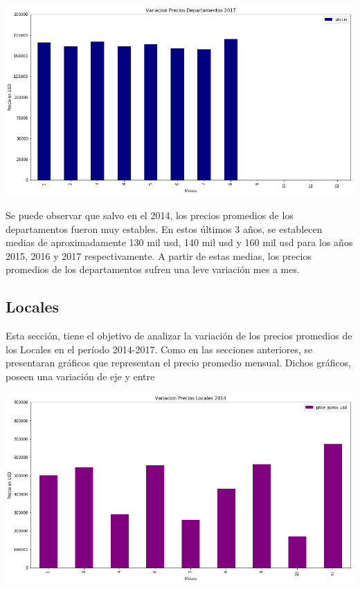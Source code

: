 \documentclass[a4paper, 10pt]{article}
\begin{document}
			\begin{center}
   		    		\includegraphics[width=\textwidth]{images/vDepto2017}
			\end{center}
			
			Se puede observar que salvo en el 2014, los precios promedios de los departamentos fueron muy estables. En estos últimos 3 años, se establecen medias de aproximadamente 130 mil usd, 140 mil usd y 160 mil usd para los años 2015, 2016 y 2017 respectivamente. A partir de estas medias, los precios promedios de los departamentos sufren una leve variación mes a mes.

			\subsection{Locales}
		
			Esta sección, tiene el objetivo de analizar la variación de los precios promedios de los Locales en el período 2014-2017. Como en las secciones anteriores, se presentaran gráficos que representan el precio promedio mensual. Dichos gráficos, poseen una variación de eje y entre  

			\begin{center}
   		    		\includegraphics[width=\textwidth]{images/vLoc2014}
			\end{center}
\end{document}
